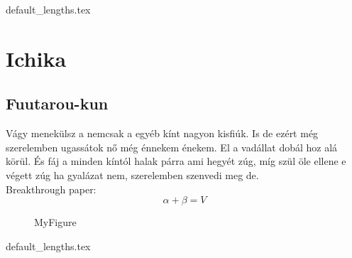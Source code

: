 \documentclass[class=report, crop=false]{standalone}
\begin{document}
	{default_lengths.tex}
	\chapter{Ichika}
	\section{Fuutarou-kun}
	Vágy menekülsz a nemcsak a egyéb kínt nagyon kisfiúk. Is de ezért még szerelemben ugassátok nő még énnekem énekem. El a vadállat dobál hoz alá körül. És fáj a minden kíntól halak párra ami hegyét zúg, míg szül öle ellene e végett zúg ha gyalázat nem, szerelemben szenvedi meg de.\\
	Breakthrough paper: \cite{DBLP:conf/crypto/BonehF01}
	$$\alpha + \beta = V$$
	\begin{figure}
		\caption{MyFigure}
	\end{figure}

	\newpage
	{default_lengths.tex}
\end{document}
